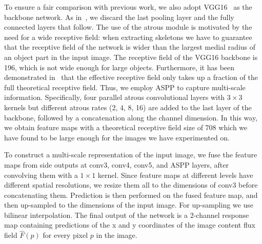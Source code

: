 \documentclass[10pt,twocolumn,letterpaper]{article}
\begin{document}
To ensure a fair comparison with previous work, we also adopt VGG16~\cite{vgg16network} as the backbone network.
As in~\cite{xie2015hed}, we discard the last pooling layer and the fully connected layers that follow.
The use of the atrous module is motivated by the need for a wide receptive field: when extracting skeletons we have to guarantee that the receptive field of the network is wider than the largest medial radius of an object part in the input image.
The receptive field of the VGG16 backbone is 196, which is not wide enough for large objects.
Furthermore, it has been demonstrated in~\cite{luo2016receptivefield} that the effective receptive field only takes up a fraction of the full theoretical receptive field.
Thus, we employ ASPP to capture multi-scale information.
Specifically, four parallel atrous convolutional layers with $3\times3$ kernels but different atrous rates (2, 4, 8, 16) are added to the last layer of the backbone, followed by a concatenation along the channel dimension.
In this way, we obtain feature maps with a theoretical receptive field size of 708 which we have found to be large enough for the images we have experimented on.

To construct a multi-scale representation of the input image, we fuse the feature maps from side outputs at conv3, conv4, conv5, and ASPP layers, after convolving them with a  $1 \times 1$ kernel.
Since feature maps at different levels have different spatial resolutions, we resize them all to the dimensions of conv3 before concatenating them.
Prediction is then performed on the fused feature map, and then up-sampled to the dimensions of the input image.
For up-sampling we use bilinear interpolation.
The final output of the network is a 2-channel response map containing predictions of the x and y coordinates of the image content flux field $\hat{F}(p)$ for every pixel $p$ in the image.
\end{document}
